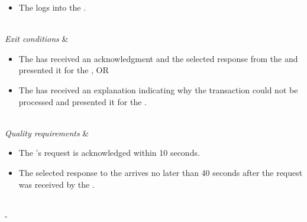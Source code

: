 \begin{table}[H]
\begin{tabu}
	\begin{itemize}[leftmargin=*,topsep=0pt,itemsep=-1ex]
		\item The \researcher logs into the \client.
	\end{itemize} \\
	\hline
	\textit{Exit conditions} &
	\vspace{-3mm}
	\begin{itemize}[leftmargin=*,topsep=0pt,itemsep=-1ex]
		\item The \client has received an acknowledgment and the selected response from the \serverside and presented it for the \researcher, OR
		\item The \client has received an explanation indicating why the transaction could not be processed and presented it for the \researcher.
	\end{itemize} \\
	\hline
	\textit{Quality \newline requirements} &
	\vspace{-3mm}
	\begin{itemize}[leftmargin=*,topsep=0pt,itemsep=-1ex]
		\item The \researcher's request is acknowledged within 10 seconds.
		\item The selected response to the \client arrives no later than 40 seconds after the request was received by the \serverside.
	\end{itemize} \\
	\tabucline[1.5pt]-
\end{tabu}
\caption{Use case: StoreTaskData}
\label{uc:StoreTaskData}
\end{table}